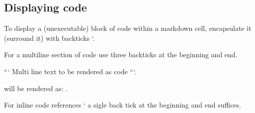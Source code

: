\documentclass[letterpaper,10pt,english]{jupyterBook}
\begin{document}
\begin{sphinxVerbatim}[commandchars=\\\{\}]
                       
                                
 \PYGZbs{}
 \PYGZbs{}
 \PYGZbs{}\PYGZbs{} \PYGZbs{}\PYGZbs{}      
 \PYGZbs{} \PYGZbs{}      
 \PYGZbs{}         

\end{sphinxVerbatim}


\subsection{Displaying code}
\label{\detokenize{content/04_PythonEssentials/Intro_Jupyter_notebook:displaying-code}}
\sphinxAtStartPar
To display a (unexecutable)  block of code within a markdown cell, encapsulate it (surround it) with backticks `.

\sphinxAtStartPar
For a multiline section of code use three backticks at the beginning and end.

\sphinxAtStartPar
```
Multi line
text to be rendered as code
```.

\sphinxAtStartPar
will be rendered as: .

\begin{sphinxVerbatim}[commandchars=\\\{\}]

  
      
\end{sphinxVerbatim}

\sphinxAtStartPar
For inline code references ‘ a sigle back tick at the beginning and end suffices.
\end{document}
